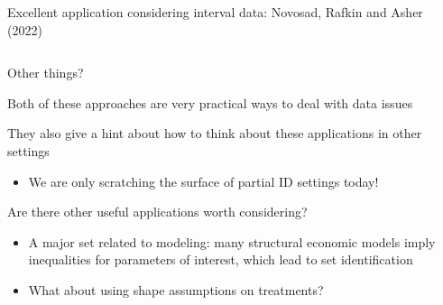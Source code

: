 \documentclass[notes,11pt, aspectratio=169]{beamer}
\newenvironment{wideitemize}{\itemize\addtolength{\itemsep}{10pt}}{\enditemize}
\begin{document}
\begin{frame}{Excellent application considering interval data: Novosad, Rafkin and Asher (2022)}
\begin{columns}[onlytextwidth, T]
\begin{column}{.5\textwidth}
      \end{column}%
    \end{columns}
\end{frame}




\begin{frame}{Other things?}
  \begin{wideitemize}
  \item Both of these approaches are very practical ways to deal with
    data issues
  \item They also give a hint about how to think about these
    applications in other settings
    \begin{itemize}
    \item We are only scratching the surface of partial ID settings today!
    \end{itemize}
  \item Are there other useful applications worth considering?
    \begin{itemize}
    \item A major set related to modeling: many structural economic
      models imply inequalities for parameters of interest, which lead
      to set identification
    \item What about using shape assumptions on treatments?
    \end{itemize}
  \end{wideitemize}

\end{frame}
\end{document}

